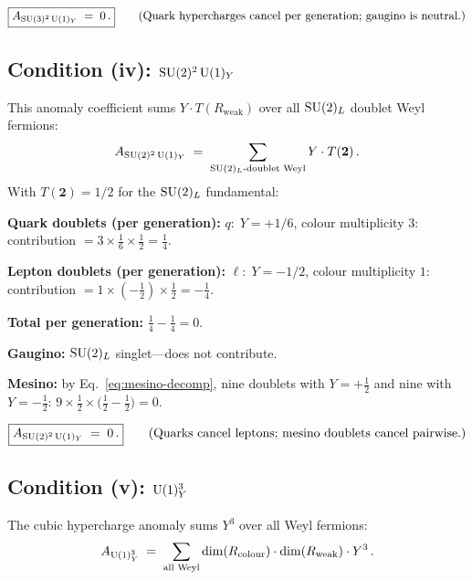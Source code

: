 \documentclass[11pt,a4paper]{article}
\begin{document}
\begin{equation}\label{eq:su3sq-u1-result}
  \boxed{A_{\mathrm{SU}(3)^2\,\mathrm{U}(1)_Y} \;=\; 0\,.}
  \qquad\text{(Quark hypercharges cancel per generation; gaugino is neutral.)}
\end{equation}

\subsection{Condition (iv): $\mathrm{SU}(2)^2\,\mathrm{U}(1)_Y$}

This anomaly coefficient sums $Y \cdot T(R_{\text{weak}})$ over all
$\mathrm{SU}(2)_L$ doublet Weyl fermions:
\begin{equation}\label{eq:su2sq-u1}
  A_{\mathrm{SU}(2)^2\,\mathrm{U}(1)_Y}
  \;=\; \sum_{\mathrm{SU}(2)_L\text{-doublet Weyl}} Y \cdot T(\mathbf{2})\,.
\end{equation}
With $T(\mathbf{2}) = 1/2$ for the $\mathrm{SU}(2)_L$ fundamental:

\textbf{Quark doublets (per generation):}
$q:\; Y = +1/6$, colour multiplicity $3$:
contribution $= 3 \times \tfrac{1}{6} \times \tfrac{1}{2} = \tfrac{1}{4}$.

\textbf{Lepton doublets (per generation):}
$\ell:\; Y = -1/2$, colour multiplicity $1$:
contribution $= 1 \times (-\tfrac{1}{2}) \times \tfrac{1}{2} = -\tfrac{1}{4}$.

\textbf{Total per generation:} $\tfrac{1}{4} - \tfrac{1}{4} = 0$.

\textbf{Gaugino:} $\mathrm{SU}(2)_L$ singlet---does not contribute.

\textbf{Mesino:} by Eq.~\eqref{eq:mesino-decomp}, nine doublets with
$Y = +\tfrac{1}{2}$ and nine with $Y = -\tfrac{1}{2}$:
$9 \times \tfrac{1}{2} \times \bigl(\tfrac{1}{2} - \tfrac{1}{2}\bigr) = 0$.

\begin{equation}\label{eq:su2sq-u1-result}
  \boxed{A_{\mathrm{SU}(2)^2\,\mathrm{U}(1)_Y} \;=\; 0\,.}
  \qquad\text{(Quarks cancel leptons; mesino doublets cancel pairwise.)}
\end{equation}

\subsection{Condition (v): $\mathrm{U}(1)_Y^3$}

The cubic hypercharge anomaly sums $Y^3$ over all Weyl fermions:
\begin{equation}\label{eq:u1-cubed}
  A_{\mathrm{U}(1)_Y^3}
  \;=\; \sum_{\text{all Weyl}} \dim(R_{\text{colour}}) \cdot \dim(R_{\text{weak}}) \cdot Y^3\,.
\end{equation}
\end{document}
